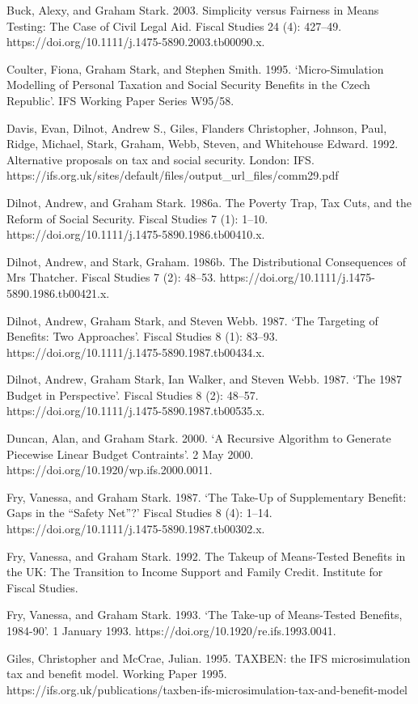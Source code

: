 \documentclass[
  letterpaper,
  DIV=11,
  numbers=noendperiod]{scrartcl}
\begin{document}
Buck, Alexy, and Graham Stark. 2003. Simplicity versus Fairness in Means
Testing: The Case of Civil Legal Aid. Fiscal Studies 24 (4): 427--49.
https://doi.org/10.1111/j.1475-5890.2003.tb00090.x.

Coulter, Fiona, Graham Stark, and Stephen Smith. 1995. `Micro-Simulation
Modelling of Personal Taxation and Social Security Benefits in the Czech
Republic'. IFS Working Paper Series W95/58.

Davis, Evan, Dilnot, Andrew S., Giles, Flanders Christopher, Johnson,
Paul, Ridge, Michael, Stark, Graham, Webb, Steven, and Whitehouse
Edward. 1992. Alternative proposals on tax and social security. London:
IFS.
https://ifs.org.uk/sites/default/files/output\_url\_files/comm29.pdf

Dilnot, Andrew, and Graham Stark. 1986a. The Poverty Trap, Tax Cuts, and
the Reform of Social Security. Fiscal Studies 7 (1): 1--10.
https://doi.org/10.1111/j.1475-5890.1986.tb00410.x.

Dilnot, Andrew, and Stark, Graham. 1986b. The Distributional
Consequences of Mrs Thatcher. Fiscal Studies 7 (2): 48--53.
https://doi.org/10.1111/j.1475-5890.1986.tb00421.x.

Dilnot, Andrew, Graham Stark, and Steven Webb. 1987. `The Targeting of
Benefits: Two Approaches'. Fiscal Studies 8 (1): 83--93.
https://doi.org/10.1111/j.1475-5890.1987.tb00434.x.

Dilnot, Andrew, Graham Stark, Ian Walker, and Steven Webb. 1987. `The
1987 Budget in Perspective'. Fiscal Studies 8 (2): 48--57.
https://doi.org/10.1111/j.1475-5890.1987.tb00535.x.

Duncan, Alan, and Graham Stark. 2000. `A Recursive Algorithm to Generate
Piecewise Linear Budget Contraints'. 2 May 2000.
https://doi.org/10.1920/wp.ifs.2000.0011.

Fry, Vanessa, and Graham Stark. 1987. `The Take-Up of Supplementary
Benefit: Gaps in the ``Safety Net''?' Fiscal Studies 8 (4): 1--14.
https://doi.org/10.1111/j.1475-5890.1987.tb00302.x.

Fry, Vanessa, and Graham Stark. 1992. The Takeup of Means-Tested
Benefits in the UK: The Transition to Income Support and Family Credit.
Institute for Fiscal Studies.

Fry, Vanessa, and Graham Stark. 1993. `The Take-up of Means-Tested
Benefits, 1984-90'. 1 January 1993.
https://doi.org/10.1920/re.ifs.1993.0041.

Giles, Christopher and McCrae, Julian. 1995. TAXBEN: the IFS
microsimulation tax and benefit model. Working Paper 1995.
https://ifs.org.uk/publications/taxben-ifs-microsimulation-tax-and-benefit-model
\end{document}
